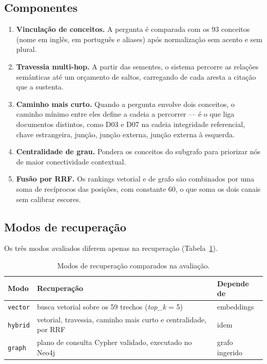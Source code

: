 \documentclass[12pt]{article}
\begin{document}
\subsection{Componentes}

\begin{enumerate}
\item \textbf{Vinculação de conceitos.} A pergunta é comparada com os 93 conceitos (nome em
  inglês, em português e aliases) após normalização sem acento e sem plural.
\item \textbf{Travessia multi-hop.} A partir das sementes, o sistema percorre as relações
  semânticas até um orçamento de saltos, carregando de cada aresta a citação que a sustenta.
\item \textbf{Caminho mais curto.} Quando a pergunta envolve dois conceitos, o caminho mínimo
  entre eles define a cadeia a percorrer --- é o que liga documentos distintos, como D03 e D07 na
  cadeia integridade referencial, chave estrangeira, junção, junção externa, junção externa à
  esquerda.
\item \textbf{Centralidade de grau.} Pondera os conceitos do subgrafo para priorizar nós de maior
  conectividade contextual.
\item \textbf{Fusão por RRF.} Os rankings vetorial e de grafo são combinados por uma soma de
  recíprocos das posições, com constante 60, o que soma os dois canais sem calibrar escores.
\end{enumerate}

\subsection{Modos de recuperação}

Os três modos avaliados diferem apenas na recuperação (Tabela~\ref{tab:modos}).

\begin{table}[h]
\centering
\caption{Modos de recuperação comparados na avaliação.}
\label{tab:modos}
\small
\begin{tabular}{@{}lll@{}}
\toprule
Modo & Recuperação & Depende de \\
\midrule
\texttt{vector} & busca vetorial sobre os 59 trechos (\emph{top\_k} = 5) & embeddings \\
\texttt{hybrid} & vetorial, travessia, caminho mais curto e centralidade, por RRF & idem \\
\texttt{graph} & plano de consulta Cypher validado, executado no Neo4j & grafo ingerido \\
\bottomrule
\end{tabular}
\end{table}
\end{document}
